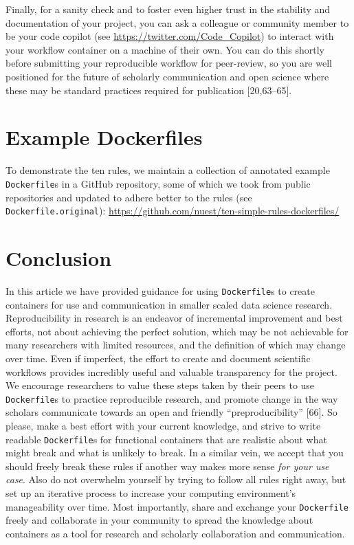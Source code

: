\documentclass[10pt,letterpaper]{article}
\begin{document}
Finally, for a sanity check and to foster even higher trust in the
stability and documentation of your project, you can ask a colleague or
community member to be your code copilot (see
\url{https://twitter.com/Code_Copilot}) to interact with your workflow
container on a machine of their own. You can do this shortly before
submitting your reproducible workflow for peer-review, so you are well
positioned for the future of scholarly communication and open science
where these may be standard practices required for publication
{[}20,63--65{]}.

\hypertarget{example-dockerfiles}{%
\section{Example Dockerfiles}\label{example-dockerfiles}}

To demonstrate the ten rules, we maintain a collection of annotated
example \texttt{Dockerfile}s in a GitHub repository, some of which we
took from public repositories and updated to adhere better to the rules
(see \texttt{Dockerfile.original}):
\url{https://github.com/nuest/ten-simple-rules-dockerfiles/}

\hypertarget{conclusion}{%
\section*{Conclusion}\label{conclusion}}

In this article we have provided guidance for using \texttt{Dockerfile}s
to create containers for use and communication in smaller scaled data
science research. Reproducibility in research is an endeavor of
incremental improvement and best efforts, not about achieving the
perfect solution, which may be not achievable for many researchers with
limited resources, and the definition of which may change over time.
Even if imperfect, the effort to create and document scientific
workflows provides incredibly useful and valuable transparency for the
project. We encourage researchers to value these steps taken by their
peers to use \texttt{Dockerfile}s to practice reproducible research, and
promote change in the way scholars communicate towards an open and
friendly ``preproducibility'' {[}66{]}. So please, make a best effort
with your current knowledge, and strive to write readable
\texttt{Dockerfile}s for functional containers that are realistic about
what might break and what is unlikely to break. In a similar vein, we
accept that you should freely break these rules if another way makes
more sense \emph{for your use case}. Also do not overwhelm yourself by
trying to follow all rules right away, but set up an iterative process
to increase your computing environment's manageability over time. Most
importantly, share and exchange your \texttt{Dockerfile} freely and
collaborate in your community to spread the knowledge about containers
as a tool for research and scholarly collaboration and communication.
\end{document}

